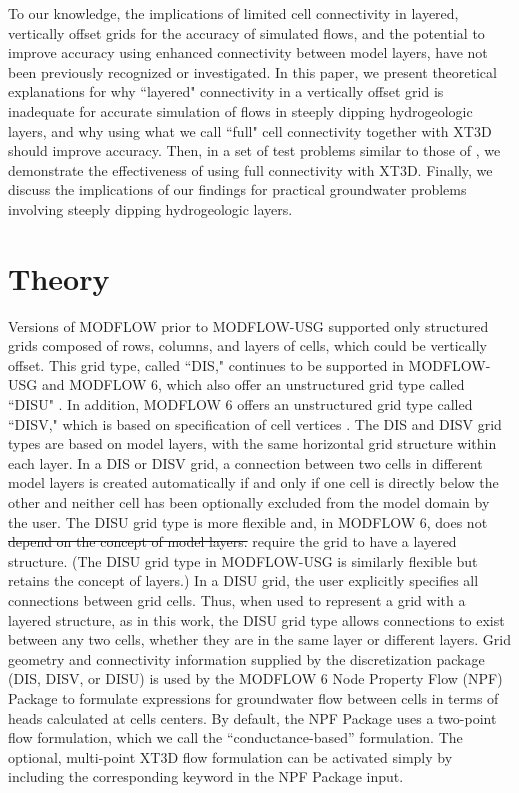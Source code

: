 \documentclass{article}
\begin{document}
To our knowledge, the implications of limited cell connectivity in layered, vertically offset grids for the accuracy of simulated flows, and the potential to improve accuracy using enhanced connectivity between model layers, have not been previously recognized or investigated. In this paper, we present theoretical explanations for why ``layered" connectivity in a vertically offset grid is inadequate for accurate simulation of flows in steeply dipping hydrogeologic layers, and why using what we call ``full" cell connectivity together with XT3D should improve accuracy. Then, in a set of test problems similar to those of \cite{bardot2023}, we demonstrate the effectiveness of using full connectivity with XT3D. Finally, we discuss the implications of our findings for practical groundwater problems involving steeply dipping hydrogeologic layers.

\section*{Theory}

Versions of MODFLOW prior to MODFLOW-USG \citep{modflowusg} supported only structured grids composed of rows, columns, and layers of cells, which could be vertically offset. This grid type, called ``DIS," continues to be supported in MODFLOW-USG and MODFLOW 6, which also offer an unstructured grid type called ``DISU" \citep{modflowusg, modflow6gwf}. In addition, MODFLOW 6 offers an  unstructured grid type called ``DISV," which is based on specification of cell vertices \citep{modflow6gwf}. The DIS and DISV grid types are based on model layers, with the same horizontal grid structure within each layer. {\color{red} In a DIS or DISV grid, a connection between two cells in different model layers is created automatically if and only if one cell is directly below the other and neither cell has been optionally excluded from the model domain by the user.} The DISU grid type is more flexible and{\color{red}, in MODFLOW 6,} does not {\color{red} \sout{depend on the concept of model layers.}}{\color{red} require the grid to have a layered structure. (The DISU grid type in MODFLOW-USG is similarly flexible but retains the concept of layers.) In a DISU grid, the user explicitly specifies all connections between grid cells. Thus, when used to represent a grid with a layered structure, as in this work, the DISU grid type allows connections to exist between any two cells, whether they are in the same layer or different layers. Grid geometry and connectivity information supplied by the discretization package (DIS, DISV, or DISU) is used by the MODFLOW 6 Node Property Flow (NPF) Package to formulate expressions for groundwater flow between cells in terms of heads calculated at cells centers. By default, the NPF Package uses a two-point flow formulation, which we call the ``conductance-based'' formulation. The optional, multi-point XT3D flow formulation can be activated simply by including the corresponding keyword in the NPF Package input.}
\end{document}
